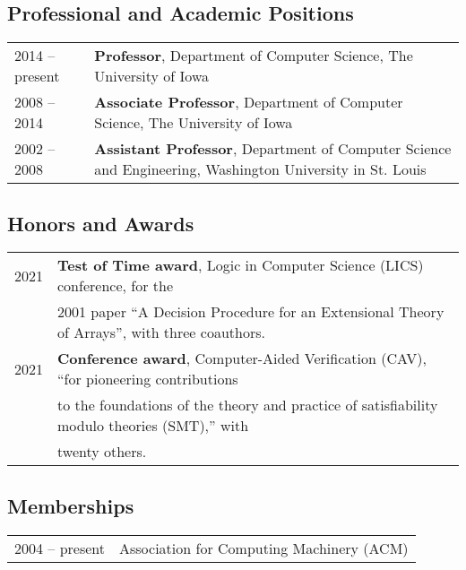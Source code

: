 \documentclass[10pt]{article}
\begin{document}
\subsection*{Professional and Academic Positions}
\smallskip

\quad
\begin{tabular}{l@{\quad\ }p{35em}}
 2014 -- present
 & {\bf Professor}, Department of Computer Science, 
   The University of Iowa
 \\[3.5ex]
 2008 -- 2014
 & {\bf Associate Professor}, Department of Computer Science, 
   The University of Iowa
 \\[3.5ex]
 2002 -- 2008
 & {\bf Assistant Professor}, Department of Computer Science and Engineering, 
   Washington University in St. Louis
 \\[3.5ex]
\end{tabular}



\subsection*{Honors and Awards}
\smallskip

\quad
\begin{tabular}{l@{\quad\ }l}
 2021
 & {\bf Test of Time award}, Logic in Computer Science (LICS) conference, for the \\
 \ & 2001 paper ``A Decision Procedure for an Extensional Theory of Arrays'', with three coauthors.
 \\[.5ex]
 2021
 & {\bf Conference award}, Computer-Aided Verification (CAV), ``for pioneering contributions \\
 \ & to the foundations of the theory and practice of satisfiability modulo theories (SMT),'' with \\
 \ & twenty others.
 \\[.5ex]
\end{tabular}


\subsection*{Memberships}
\smallskip

\quad
\begin{tabular}{l@{\quad\ }l}
 2004 -- present
 & Association for Computing Machinery (ACM)
 \\[.5ex]
\end{tabular}
\end{document}
